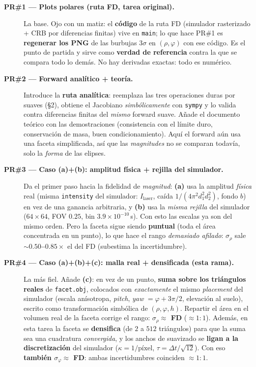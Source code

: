 \documentclass[11pt,a4paper]{article}
\begin{document}
\begin{description}
\item[\textbf{PR\#1 --- Plots polares (ruta FD, tarea original).}] La base. Ojo
  con un matiz: el \textbf{c\'odigo} de la ruta FD (simulador rasterizado + CRB por
  diferencias finitas) vive en \texttt{main}; lo que hace PR\#1 es
  \textbf{regenerar los PNG} de las burbujas $3\sigma$ en $(\rho,\varphi)$ con ese
  c\'odigo. Es el punto de partida y sirve como \textbf{verdad de referencia}
  contra la que se compara todo lo dem\'as. No hay derivadas exactas: todo es
  num\'erico.

\item[\textbf{PR\#2 --- Forward anal\'itico + teor\'ia.}] Introduce la
  \textbf{ruta anal\'itica}: reemplaza las tres operaciones duras por suaves
  (\S2), obtiene el Jacobiano \emph{simb\'olicamente} con \texttt{sympy} y lo
  valida contra diferencias finitas del \emph{mismo} forward suave. A\~nade el
  documento te\'orico con las demostraciones (consistencia con el l\'imite duro,
  conservaci\'on de masa, buen condicionamiento). Aqu\'i el forward a\'un usa una
  faceta simplificada, as\'i que las \emph{magnitudes} no se comparan todav\'ia,
  solo la \emph{forma} de las elipses.

\item[\textbf{PR\#3 --- Caso (a)+(b): amplitud f\'isica + rejilla del simulador.}]
  Da el primer paso hacia la fidelidad de \emph{magnitud}: \textbf{(a)} usa la
  amplitud \emph{f\'isica} real (misma \texttt{intensity} del simulador:
  $I_{\text{laser}}$, ca\'ida $1/(4\pi^2 d_1^2 d_2^2)$, fondo $b$) en vez de una
  ganancia arbitraria, y \textbf{(b)} usa la \emph{misma rejilla} del simulador
  ($64\times64$, FOV $0.25$, bin $3.9\times10^{-10}$\,s). Con esto las escalas ya
  son del mismo orden. Pero la faceta sigue siendo \textbf{puntual} (toda el
  \'area concentrada en un punto), lo que hace el rango \emph{demasiado afilado}:
  $\sigma_\rho$ sale \textbf{$\sim0.50$--$0.85\times$} el del FD (subestima la
  incertidumbre).

\item[\textbf{PR\#4 --- Caso (a)+(b)+(c): malla real + densificada (esta rama).}]
  La m\'as fiel. A\~nade \textbf{(c)}: en vez de un punto, \textbf{suma sobre los
  tri\'angulos reales} de \texttt{facet.obj}, colocados con \emph{exactamente} el
  mismo \emph{placement} del simulador (escala an\'isotropa, \emph{pitch},
  \emph{yaw} $=\varphi+3\pi/2$, elevaci\'on al suelo), escrito como transformaci\'on
  simb\'olica de $(\rho,\varphi,h)$. Repartir el \'area en el volumen real de la
  faceta corrige el rango: \textbf{$\sigma_\rho\approx$ FD} ($\approx1{:}1$).
  Adem\'as, en esta tarea la faceta se \textbf{densifica} (de $2$ a $512$
  tri\'angulos) para que la suma sea una cuadratura \emph{convergida}, y los
  anchos de suavizado se \textbf{ligan a la discretizaci\'on} del simulador
  ($\kappa=1/\text{p\'ixel}$, $\tau=\Delta t/\sqrt{12}$). Con eso \textbf{tambi\'en
  $\sigma_\varphi\approx$ FD}: ambas incertidumbres coinciden $\approx1{:}1$.
\end{description}
\end{document}
